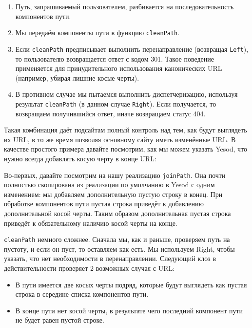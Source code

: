 \begin{enumerate}
  \item Путь, запрашиваемый пользователем, разбивается на последовательность
      компонентов пути.

  \item Мы передаём компоненты пути в функцию \lstinline!cleanPath!.

  \item Если \lstinline!cleanPath! предписывает выполнить перенаправление
      (возвращая \lstinline!Left!), то пользователю возвращается ответ с кодом
      301. Такое поведение применяется для принудительного использования
      канонических URL (например, убирая лишние косые черты).

  \item В противном случае мы пытаемся выполнить диспетчеризацию, используя
      результат \lstinline!cleanPath! (в данном случае \lstinline!Right!). Если
      получается, то возвращаем получившийся ответ, иначе возвращаем статус
      404.
\end{enumerate}

Такая комбинация даёт подсайтам полный контроль над тем, как будут выглядеть их
URL, в то же время позволяя основному сайту иметь изменённые URL. В качестве
простого примера давайте посмотрим, как мы можем указать Yesod, что нужно
всегда добавлять косую черту в конце URL:

Во-первых, давайте посмотрим на нашу реализацию \lstinline!joinPath!. Она почти
полностью скопирована из реализации по умолчанию в Yesod с одним изменением: мы
добавляем дополнительную пустую строку в конец. При обработке компонентов пути
пустая строка приведёт к добавлению дополнительной косой черты. Таким образом
дополнительная пустая строка приведёт к обязательному наличию косой черты на
конце.

\lstinline!cleanPath! немного сложнее. Сначала мы, как и раньше, проверяем путь
на пустоту, и если он пуст, то оставляем как есть. Мы используем Right, чтобы
указать, что нет необходимости в перенаправлении. Следующий клоз в
действительности проверяет 2 возможных случая с URL:

\begin{itemize}
  \item В пути имеется две косых черты подряд, которые будут выглядеть как
      пустая строка в середине списка компонентов пути.

  \item В конце пути нет косой черты, в результате чего последний компонент
      пути не будет равен пустой строке.
\end{itemize}

